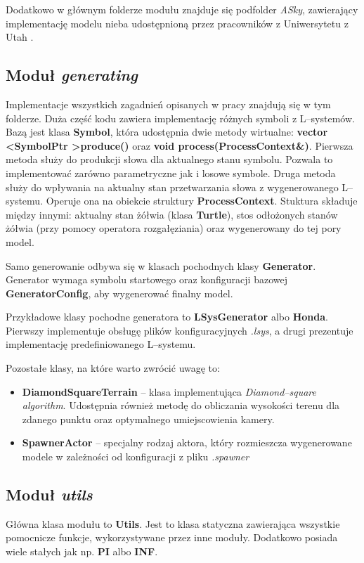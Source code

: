 \documentclass[inz,shortabstract]{iithesis}
\begin{document}
            Dodatkowo w głównym folderze modułu znajduje się podfolder \textit{ASky}, zawierający implementację modelu nieba udostępnioną przez pracowników z Uniwersytetu z Utah \cite{sky}.
            
        \subsection{Moduł \textit{generating}}
            Implementacje wszystkich zagadnień opisanych w pracy znajdują się w tym folderze. Duża część kodu zawiera implementację różnych symboli z L--systemów. Bazą jest klasa \textbf{Symbol}, która udostępnia dwie metody wirtualne: \textbf{vector \textless SymbolPtr \textgreater produce()} oraz \textbf{void process(ProcessContext\&)}. Pierwsza metoda służy do produkcji słowa dla aktualnego stanu symbolu. Pozwala to implementować zarówno parametryczne jak i losowe symbole. Druga metoda służy do wpływania na aktualny stan przetwarzania słowa z wygenerowanego L--systemu. Operuje ona na obiekcie struktury \textbf{ProcessContext}. Stuktura składuje między innymi: aktualny stan żółwia (klasa \textbf{Turtle}), stos odłożonych stanów żółwia (przy pomocy operatora rozgałęziania) oraz wygenerowany do tej pory model.
            
            Samo generowanie odbywa się w klasach pochodnych klasy \textbf{Generator}. Generator wymaga symbolu startowego oraz konfiguracji bazowej \textbf{GeneratorConfig}, aby wygenerować finalny model.
            
            Przykładowe klasy pochodne generatora to \textbf{LSysGenerator} albo \textbf{Honda}. Pierwszy implementuje obsługę plików konfiguracyjnych \textit{.lsys}, a drugi prezentuje implementację predefiniowanego L--systemu.
            
            Pozostałe klasy, na które warto zwrócić uwagę to:
            \begin{itemize}
                \item \textbf{DiamondSquareTerrain} -- klasa implementująca \textit{Diamond--square algorithm}. Udostępnia również metodę do obliczania wysokości terenu dla zdanego punktu oraz optymalnego umiejscowienia kamery.
                \item \textbf{SpawnerActor} -- specjalny rodzaj aktora, który rozmieszcza wygenerowane modele w zależności od konfiguracji z pliku \textit{.spawner} 
            \end{itemize}
            
        \subsection{Moduł \textit{utils}}
            Główna klasa modułu to \textbf{Utils}. Jest to klasa statyczna zawierająca wszystkie pomocnicze funkcje, wykorzystywane przez inne moduły. Dodatkowo posiada wiele stałych jak np. \textbf{PI} albo \textbf{INF}.
            
\end{document}
